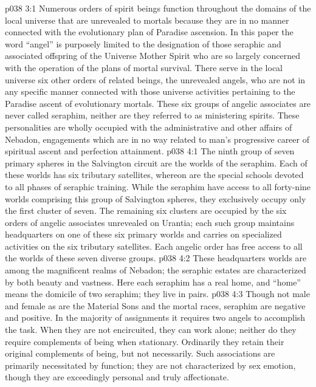 \vs p038 3:1 Numerous orders of spirit beings function throughout the domains of the local universe that are unrevealed to mortals because they are in no manner connected with the evolutionary plan of Paradise ascension. In this paper the word “angel” is purposely limited to the designation of those seraphic and associated offspring of the Universe Mother Spirit who are so largely concerned with the operation of the plans of mortal survival. There serve in the local universe six other orders of related beings, the unrevealed angels, who are not in any specific manner connected with those universe activities pertaining to the Paradise ascent of evolutionary mortals. These six groups of angelic associates are never called seraphim, neither are they referred to as ministering spirits. These personalities are wholly occupied with the administrative and other affairs of Nebadon, engagements which are in no way related to man’s progressive career of spiritual ascent and perfection attainment.\plusone
{}
\vs p038 4:1 The ninth group of seven primary spheres in the Salvington circuit are the worlds of the seraphim. Each of these worlds has six tributary satellites, whereon are the special schools devoted to all phases of seraphic training. While the seraphim have access to all forty\hyp{}nine worlds comprising this group of Salvington spheres, they exclusively occupy only the first cluster of seven. The remaining six clusters are occupied by the six orders of angelic associates unrevealed on Urantia; each such group maintains headquarters on one of these six primary worlds and carries on specialized activities on the six tributary satellites. Each angelic order has free access to all the worlds of these seven diverse groups.
\vs p038 4:2 These headquarters worlds are among the magnificent realms of Nebadon; the seraphic estates are characterized by both beauty and vastness. Here each seraphim has a real home, and “home” means the domicile of two seraphim; they live in pairs.
\pc \vs p038 4:3 Though not male and female as are the Material Sons and the mortal races, seraphim are negative and positive. In the majority of assignments it requires two angels to accomplish the task. When they are not encircuited, they can work alone; neither do they require complements of being when stationary. Ordinarily they retain their original complements of being, but not necessarily. Such associations are primarily necessitated by function; they are not characterized by sex emotion, though they are exceedingly personal and truly affectionate.
